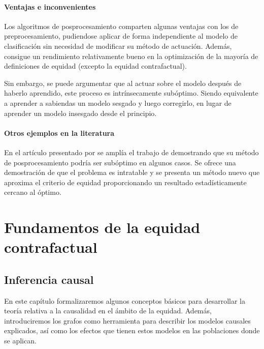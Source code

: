 \documentclass[oneside,openright,titlepage,numbers=noenddot,openany,headinclude,footinclude=true,
cleardoublepage=empty,abstractoff,BCOR=5mm,paper=a4,fontsize=12pt,main=spanish]{scrreprt}
\begin{document}
\subsection*{Ventajas e inconvenientes}

Los algoritmos de posprocesamiento comparten algunas ventajas con los de preprocesamiento, pudiendose aplicar de forma independiente al modelo de clasificación sin necesidad de modificar su método de actuación. Además, consigue un rendimiento relativamente bueno en la optimización de la mayoría de definiciones de equidad (excepto la  equidad contrafactual).

Sin embargo, se puede argumentar que al actuar sobre el modelo después de haberlo aprendido, este proceso es intrínsecamente subóptimo. Siendo equivalente a aprender a sabiendas un modelo sesgado y luego corregirlo, en lugar de aprender un modelo insesgado desde el principio.

\subsection*{Otros ejemplos en la literatura}

En el artículo presentado por \cite{woodworth2017} se amplía el trabajo de \cite{eodd2016} demostrando que su método de posprocesamiento podría ser subóptimo en algunos casos. Se ofrece una demostración de que el problema es intratable y se presenta un método nuevo que aproxima el criterio de equidad proporcionando un resultado estadísticamente cercano al óptimo.

\part{Fundamentos de la equidad contrafactual}

\chapter{Inferencia causal}

En este capítulo formalizaremos algunos conceptos básicos para desarrollar la teoría relativa a la causalidad en el ámbito de la equidad. Además, introduciremos los grafos como herramienta para describir los modelos causales explicados, así como los efectos que tienen estos modelos en las poblaciones donde se aplican.
\end{document}

